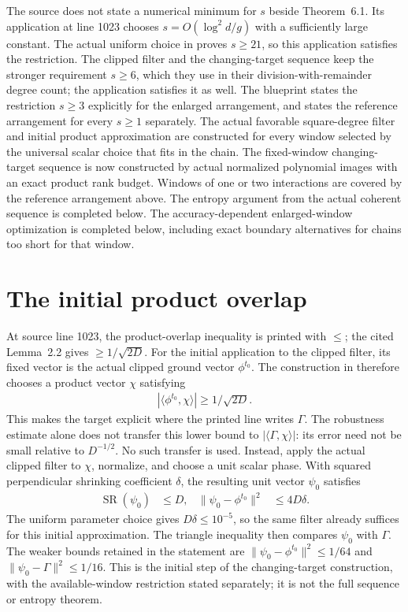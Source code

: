\documentclass{article}
\begin{document}
The source does not state a numerical minimum for $s$ beside
Theorem~6.1. Its application at line 1023 chooses $s=O(\log^2 d/g)$ with
a sufficiently large constant. The actual uniform choice in
 proves $s\ge21$, so this
application satisfies the restriction. The clipped filter and the
changing-target sequence keep the stronger requirement $s\ge6$, which
they use in their division-with-remainder degree count; the application
satisfies it as well. The blueprint states the restriction $s\ge3$
explicitly for the enlarged arrangement, and states the reference
arrangement for every $s\ge1$ separately.
The actual favorable square-degree filter and initial product approximation
are constructed for every window selected by the universal scalar choice
that fits in the chain. The fixed-window changing-target sequence is now constructed by actual
normalized polynomial images with an exact product rank budget. Windows of
one or two interactions are covered by the reference arrangement above. The entropy
argument from the actual coherent sequence is completed below. The
accuracy-dependent enlarged-window optimization is completed below,
including exact boundary alternatives for chains too short for that window.
\section{The initial product overlap}

At source line 1023, the product-overlap inequality is printed with
$\le$; the cited Lemma~2.2 gives $\ge1/\sqrt{2D}$.
For the initial application to the clipped filter, its fixed vector is the
actual clipped ground vector $\phi^{t_0}$.
The construction in 
therefore chooses a product vector $\chi$ satisfying
\begin{align*}
 |\langle\phi^{t_0},\chi\rangle|\ge1/\sqrt{2D}.
\end{align*}
This makes the target explicit where the printed line writes $\Gamma$.
The robustness estimate alone does not transfer this lower bound to
$|\langle\Gamma,\chi\rangle|$: its error need not be small relative to
$D^{-1/2}$. No such transfer is used.
Instead, apply the actual clipped filter to $\chi$, normalize, and choose a
unit scalar phase. With squared perpendicular shrinking coefficient $\delta$,
the resulting unit vector $\psi_0$ satisfies
\begin{align*}
 \operatorname{SR}(\psi_0)&\le D,&
 \|\psi_0-\phi^{t_0}\|^2&\le4D\delta.
\end{align*}
The uniform parameter choice gives $D\delta\le10^{-5}$, so the same filter
already suffices for this initial approximation. The triangle inequality
then compares $\psi_0$ with $\Gamma$. The weaker bounds retained in the
statement are $\|\psi_0-\phi^{t_0}\|^2\le1/64$ and
$\|\psi_0-\Gamma\|^2\le1/16$.
This is the initial step of the changing-target construction, with the
available-window restriction stated separately; it is not the full
sequence or entropy theorem.
\end{document}
